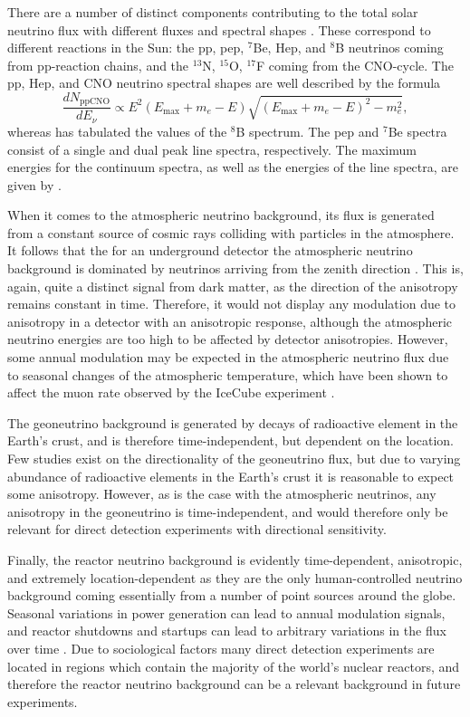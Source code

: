 \documentclass[b5paper, 10pt, twoside]{book}
\newcommand{\der}[2]{\frac{d#1}{d#2}}
\begin{document}
There are a number of distinct components contributing to the total solar neutrino flux with different fluxes and spectral shapes \parencite{VitaglianoTamborraRaffelt2020}. These correspond to different reactions in the Sun: the pp, pep, $^7$Be, Hep, and $^8$B neutrinos coming from pp-reaction chains, and the $^{13}$N, $^{15}$O, $^{17}$F coming from the CNO-cycle. The pp, Hep, and CNO neutrino spectral shapes are well described by the formula
\begin{equation}
    \der{N_\text{ppCNO}}{E_\nu}\propto E^2(E_\text{max}+m_e-E)\sqrt{(E_\text{max}+m_e-E)^2-m_e^2},
\end{equation}
whereas \textcite{BahcallEtAl1996} has tabulated the values of the $^8$B spectrum. The pep and $^7$Be spectra consist of a single and dual peak line spectra, respectively. The maximum energies for the continuum spectra, as well as the energies of the line spectra, are given by \textcite{Bahcall1997}.

When it comes to the atmospheric neutrino background, its flux is generated from a constant source of cosmic rays colliding with particles in the atmosphere. It follows that the for an underground detector the atmospheric neutrino background is dominated by neutrinos arriving from the zenith direction \parencite{GaisserHonda2002}. This is, again, quite a distinct signal from dark matter, as the direction of the anisotropy remains constant in time. Therefore, it would not display any modulation due to anisotropy in a detector with an anisotropic response, although the atmospheric neutrino energies are too high to be affected by detector anisotropies. However, some annual modulation may be expected in the atmospheric neutrino flux due to seasonal changes of the atmospheric temperature, which have been shown to affect the muon rate observed by the IceCube experiment \parencite{SerapEtAl2010}.

The geoneutrino background is generated by decays of radioactive element in the Earth's crust, and is therefore time-independent, but dependent on the location. Few studies exist on the directionality of the geoneutrino flux, but due to varying abundance of radioactive elements in the Earth's crust it is reasonable to expect some anisotropy. However, as is the case with the atmospheric neutrinos, any anisotropy in the geoneutrino is time-independent, and would therefore only be relevant for direct detection experiments with directional sensitivity.

Finally, the reactor neutrino background is evidently time-dependent, anisotropic, and extremely location-dependent as they are the only human-controlled neutrino background coming essentially from a number of point sources around the globe. Seasonal variations in power generation can lead to annual modulation signals, and reactor shutdowns and startups can lead to arbitrary variations in the flux over time \parencite{Baldoncini2015}. Due to sociological factors many direct detection experiments are located in regions which contain the majority of the world's nuclear reactors, and therefore the reactor neutrino background can be a relevant background in future experiments.
\end{document}
